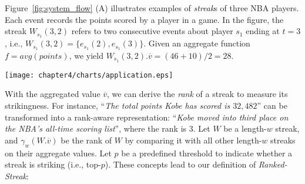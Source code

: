 \begin{example}
Figure~\ref{fig:system_flow} (A) illustrates examples of \textit{streak}s of three NBA players. 
Each event records the points scored by a player in a game. 
In the figure, the streak $W_{s_1}(3,2)$ refers to two consecutive events
about player $s_1$ ending at $t=3$, i.e., $W_{s_1}(3,2)=\{e_{s_1}(2), e_{s_1}(3)\}$. 
Given an aggregate function $f=avg(points)$,  we yield $W_{s_1}(3,2).\overline{v}=(46+10)/2=28$.
\end{example}

\begin{figure*}[t]
\centering
\texttt{[image: chapter4/charts/application.eps]}
	\caption{An illustration of $k$-Sketch query processing. 
(A): various streaks are formed based on events' sequence IDs. 
(B): streaks with rank greater than $p$ are filtered.
(C): ranked-streaks for each streak length.
(D): $k$-sketches are discovered for each subject from their ranked-streaks.
(E): newsworthy summary of a subject can be generated from its $k$-sketches.
}
\label{fig:system_flow}
\end{figure*}

With the aggregated value $\overline{v}$, we can derive the \emph{rank} of a streak
to measure its strikingness.
For instance, ``\textit{The total points Kobe has scored is $32,482$}'' can be transformed into a rank-aware representation: ``\textit{Kobe moved into third place on the NBA's all-time scoring list}'', where the rank is $3$. Let $W$ be a length-$w$ streak, and 
 $\gamma_w(W.\overline{v})$ be the rank of $W$ by comparing it with all other
length-$w$ streaks on their aggregate values. 
Let $p$ be a predefined threshold to indicate
whether a streak is striking (i.e., top-$p$). 
These concepts lead to our definition of  \emph{Ranked-Streak}:


%

